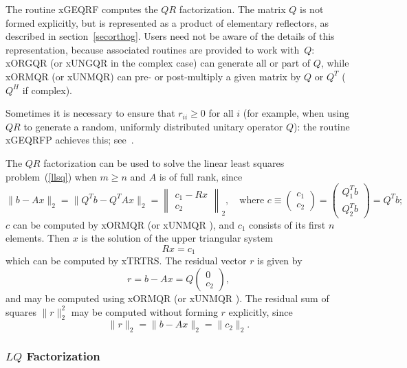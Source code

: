The routine xGEQRF
computes the $QR$ factorization. The matrix $Q$ is not
formed explicitly, but is represented as a product of elementary reflectors,
as described in section~\ref{secorthog}.
Users need not be aware of the details of this representation,
because associated routines are provided to work with~$Q$:
xORGQR (or xUNGQR
in the complex case) can generate all or part of $Q$,
while xORMQR (or xUNMQR) can pre- or post-multiply
a given matrix by $Q$ or $Q^T$ ($Q^H$ if complex).

Sometimes it is necessary to ensure that $r_{ii} \geq 0$ for all $i$ (for example,
when using $QR$ to generate a random, uniformly distributed unitary operator $Q$):
the routine xGEQRFP achieves this; see~\cite{demmeletal10}.
 
The $QR$ factorization can be used to solve the linear least squares
problem~(\ref{llsq}) when $m \geq n$ and
$A$ is of full rank, since
\[
\|b - Ax\|_2 = \| Q^T b - Q^T A x\|_2 =
\left\|\begin{array}{c} c_1 - Rx \\ c_2 \end{array}\right \|_2, \quad
\mbox{where } c \equiv
\left( \begin{array}{c} c_1 \\ c_2 \end{array} \right) =
\left( \begin{array}{c} Q_1^T b \\ Q_2^T b \end{array} \right) =
Q^T b;
\]
$c$ can be computed by xORMQR (or xUNMQR
), and $c_1$ consists of its first
$n$ elements. Then
$x$ is the solution of the upper triangular system
\[
Rx = c_1
\]
which can be computed by xTRTRS.
The residual vector $r$ is given by
\[
r = b - A x = Q \left( \begin{array}{c} 0 \\ c_2 \end{array} \right) ,
\]
and may be computed using xORMQR (or xUNMQR
).
The residual sum of squares $\|r\|_2^2$ may be computed without forming $r$
explicitly, since
\[
\|r\|_2 = \|b - Ax\|_2 = \|c_2\|_2.
\]

\subsubsection{$LQ$ Factorization}

